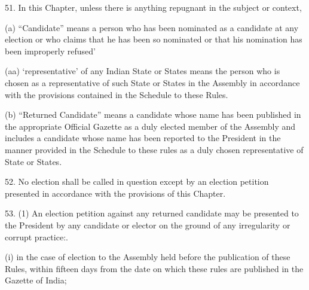 51. In this Chapter, unless there is anything repugnant in the subject or context,\textemdash{}



(a) \textquotedblleft{}Candidate\textquotedblright{} means a person who has been nominated as a candidate at any election or who claims that he has been so nominated or that his nomination has been improperly refused\textquoteright{}



(aa) \textquoteleft{}representative\textquoteright{} of any Indian State or States means the person who is chosen as a representative of such State or States in the Assembly in accordance with the provisions contained in the Schedule to these Rules.



(b) \textquotedblleft{}Returned Candidate\textquotedblright{} means a candidate whose name has been published in the appropriate Official Gazette as a duly elected member of the Assembly and includes a candidate whose name has been reported \hypertarget{jump_id_9}{}\hspace{0pt}to the President in the manner provided in \hypertarget{jump_id_10}{}\hspace{0pt}the Schedule to these rules as a duly chosen representative of \hypertarget{jump_id_11}{}\hspace{0pt}\hypertarget{jump_id_12}{}\hspace{0pt} State or States\hypertarget{jump_id_13}{}\hspace{0pt}.



52. No election shall be called in question except by an election petition presented in accordance with the provisions of this Chapter.



53. (1) An election petition against any returned candidate may be presented to the President by any candidate or elector on the ground of any irregularity or corrupt practice:.



(i) in the case of election to the Assembly held before the publication of these Rules, within fifteen days from the date on which these rules are published in the Gazette of India;



